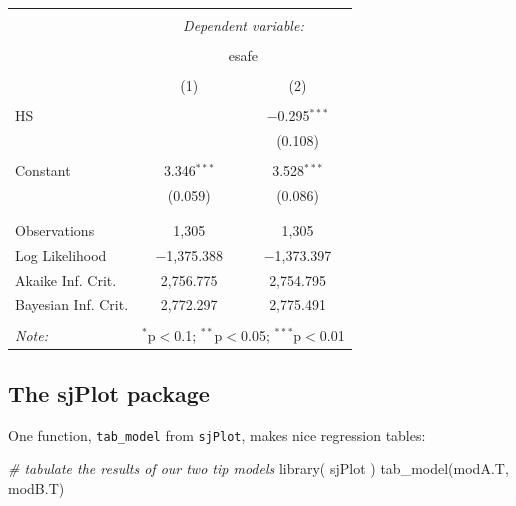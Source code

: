 \documentclass[
  letterpaper,
  DIV=11,
  numbers=noendperiod]{scrreprt}
\newenvironment{Shaded}{\begin{snugshade}}{\end{snugshade}}
\newcommand{\CommentTok}[1]{\textcolor[rgb]{0.38,0.63,0.69}{\textit{#1}}}
\newcommand{\FunctionTok}[1]{\textcolor[rgb]{0.02,0.16,0.49}{#1}}
\newcommand{\NormalTok}[1]{\textcolor[rgb]{0.00,0.44,0.13}{#1}}
\begin{document}
\begin{table}[!htbp] \centering 
  \caption{} 
  \label{} 
\begin{tabular}{@{\extracolsep{5pt}}lcc} 
\\[-1.8ex]\hline 
\hline \\[-1.8ex] 
 & \multicolumn{2}{c}{\textit{Dependent variable:}} \\ 
\cline{2-3} 
\\[-1.8ex] & \multicolumn{2}{c}{esafe} \\ 
\\[-1.8ex] & (1) & (2)\\ 
\hline \\[-1.8ex] 
 HS &  & $-$0.295$^{***}$ \\ 
  &  & (0.108) \\ 
  & & \\ 
 Constant & 3.346$^{***}$ & 3.528$^{***}$ \\ 
  & (0.059) & (0.086) \\ 
  & & \\ 
\hline \\[-1.8ex] 
Observations & 1,305 & 1,305 \\ 
Log Likelihood & $-$1,375.388 & $-$1,373.397 \\ 
Akaike Inf. Crit. & 2,756.775 & 2,754.795 \\ 
Bayesian Inf. Crit. & 2,772.297 & 2,775.491 \\ 
\hline 
\hline \\[-1.8ex] 
\textit{Note:}  & \multicolumn{2}{r}{$^{*}$p$<$0.1; $^{**}$p$<$0.05; $^{***}$p$<$0.01} \\ 
\end{tabular} 
\end{table}

\hypertarget{the-sjplot-package}{%
\subsection{The sjPlot package}\label{the-sjplot-package}}

One function, \texttt{tab\_model} from \texttt{sjPlot}, makes nice
regression tables:

\begin{Shaded}
\begin{Highlighting}[]
\CommentTok{\# tabulate the results of our two tip models}
\FunctionTok{library}\NormalTok{( sjPlot )}
\FunctionTok{tab\_model}\NormalTok{(modA.T, modB.T)}
\end{Highlighting}
\end{Shaded}
\end{document}
